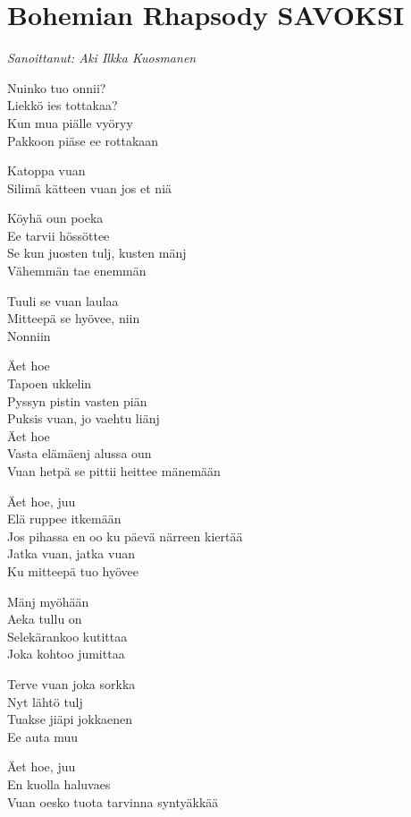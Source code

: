 \section{Bohemian Rhapsody SAVOKSI}
\vspace*{-0.55cm}
\textit{Sanoittanut: Aki Ilkka Kuosmanen}

Nuinko tuo onnii?\\
Liekkö ies tottakaa?\\
Kun mua piälle vyöryy\\
Pakkoon piäse ee rottakaan

Katoppa vuan\\
Silimä kätteen vuan jos et niä

Köyhä oun poeka\\
Ee tarvii hössöttee\\
Se kun juosten tulj, kusten mänj\\
Vähemmän tae enemmän

Tuuli se vuan laulaa\\
Mitteepä se hyövee, niin\\
Nonniin

Äet hoe\\
Tapoen ukkelin\\
Pyssyn pistin vasten piän\\
Puksis vuan, jo vaehtu liänj\\
Äet hoe\\
Vasta elämäenj alussa oun\\
Vuan hetpä se pittii heittee mänemään

Äet hoe, juu\\
Elä ruppee itkemään\\
Jos pihassa en oo ku päevä närreen kiertää\\
Jatka vuan, jatka vuan\\
Ku mitteepä tuo hyövee

Mänj myöhään\\
Aeka tullu on\\
Selekärankoo kutittaa\\
Joka kohtoo jumittaa

Terve vuan joka sorkka\\
Nyt lähtö tulj\\
Tuakse jiäpi jokkaenen\\
Ee auta muu

Äet hoe, juu\\
En kuolla haluvaes\\
Vuan oesko tuota tarvinna syntyäkkää

